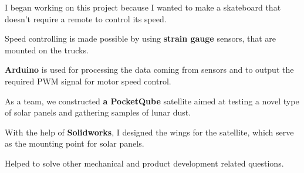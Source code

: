 \documentclass[letterpaper]{deedy-resume} %
\begin{document}
\begin{minipage}[t]{0.66\textwidth}
%
%



\begin{tightitemize}
  \item I began working on this project because I wanted to make a skateboard that doesn't require a remote to control its speed.
  \item Speed controlling is made possible by using \textbf{strain gauge} sensors, that are mounted on the trucks.
  \item \textbf{Arduino} is used for processing the data coming from sensors and to output the required PWM signal for motor speed control.
\end{tightitemize}

\sectionspace %



\begin{tightitemize}
\item As a team, we constructed \textbf{a PocketQube} satellite aimed at testing a novel type of solar panels and gathering samples of lunar dust.
\item With the help of \textbf{Solidworks}, I designed the wings for the satellite, which serve as the mounting point for solar panels.
\item Helped to solve other mechanical and product development related questions.
\end{tightitemize}


\end{minipage}
\end{document}
